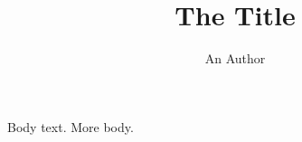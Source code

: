 \documentclass{zzfmb}
\title{The Title}\author{An Author}
\begin{document}
\maketitle
Body text.
\newpage
More body.
\end{document}
